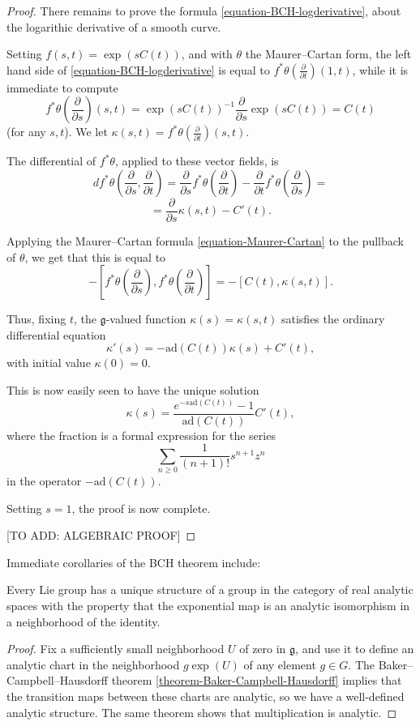 \begin{proof}
There remains to prove the formula \eqref{equation-BCH-logderivative}, about the logarithic derivative of a smooth curve. 

Setting $f(s,t) = \exp(sC(t))$, and with $\theta$ the Maurer--Cartan form, the left hand side of \eqref{equation-BCH-logderivative} is equal to $f^*\theta(\frac{\partial}{\partial t}) (1,t)$, while it is immediate to compute 
$$ f^*\theta(\frac{\partial}{\partial s}) (s,t) = \exp(s C(t))^{-1} \frac{\partial}{\partial s} \exp( sC(t)) = C(t)$$
(for any $s,t$). We let $\kappa(s,t) = f^*\theta(\frac{\partial}{\partial t}) (s,t)$.

The differential of $f^*\theta$, applied to these vector fields, is $$ df^*\theta(\frac{\partial}{\partial s}, \frac{\partial}{\partial t}) = \frac{\partial}{\partial s} f^*\theta(\frac{\partial}{\partial t}) - \frac{\partial}{\partial t} f^*\theta (\frac{\partial}{\partial s}) = $$
$$ = \frac{\partial}{\partial s} \kappa (s,t) - C'(t).$$

Applying the Maurer--Cartan formula \eqref{equation-Maurer-Cartan} to the pullback of $\theta$, we get that this is equal to 
$$ -[f^*\theta(\frac{\partial}{\partial s}), f^*\theta(\frac{\partial}{\partial t})] = - [C(t), \kappa(s,t)].$$

Thus, fixing $t$, the $\mathfrak g$-valued function $\kappa(s)=\kappa(s,t)$ satisfies the ordinary differential equation
$$ \kappa'(s) = - \text{ad}(C(t)) \kappa(s) + C'(t), $$
with initial value $\kappa(0)=0$.

This is now easily seen to have the unique solution
$$ \kappa(s) = \frac{e^{-s\text{ad} (C(t))} -1}{\text{ad}(C(t))}  C'(t),$$
where the fraction is a formal expression for the series 
$$\sum_{n\ge 0} \frac{1}{(n+1)!} s^{n+1} z^n$$
in the operator $-\text{ad}(C(t))$.

Setting $s=1$, the proof is now complete.

[TO ADD: ALGEBRAIC PROOF]

\end{proof}


Immediate corollaries of the BCH theorem include:

\begin{proposition}
\label{proposition-analyticity}
Every Lie group has a unique structure of a group in the category of real analytic spaces with the property that the exponential map is an analytic isomorphism in a neighborhood of the identity. 
\end{proposition}

\begin{proof}
Fix a sufficiently small neighborhood $U$ of zero in $\mathfrak g$, and use it to define an analytic chart in the neighborhood $g \exp(U)$ of any element $g\in G$. The Baker--Campbell--Hausdorff theorem \ref{theorem-Baker-Campbell-Hausdorff} implies that the transition maps between these charts are analytic, so we have a well-defined analytic structure. The same theorem shows that multiplication is analytic. 
\end{proof}




